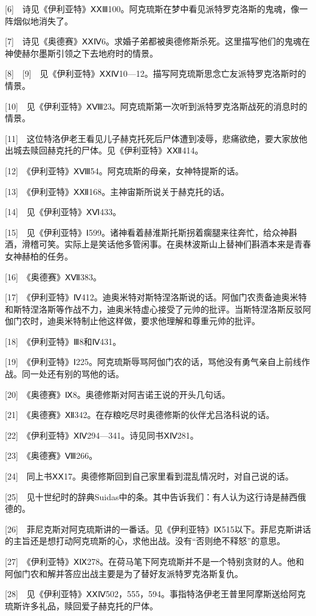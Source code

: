 \documentclass[12pt,oneside]{book}
\begin{document}
[6]　诗见《伊利亚特》ⅩⅩⅢ100。阿克琉斯在梦中看见派特罗克洛斯的鬼魂，像一阵烟似地消失了。

[7]　诗见《奥德赛》ⅩⅩⅣ6。求婚子弟都被奥德修斯杀死。这里描写他们的鬼魂在神使赫尔墨斯引领之下去地府时的情景。

[8]　[9]　见《伊利亚特》ⅩⅩⅣ10—12。描写阿克琉斯思念亡友派特罗克洛斯时的情景。

[10]　见《伊利亚特》ⅩⅧ23。阿克琉斯第一次听到派特罗克洛斯战死的消息时的情景。

[11]　这位特洛伊老王看见儿子赫克托死后尸体遭到凌辱，悲痛欲绝，要大家放他出城去赎回赫克托的尸体。见《伊利亚特》ⅩⅫ414。

[12]　《伊利亚特》ⅩⅧ54。阿克琉斯的母亲，女神特提斯的话。

[13]　《伊利亚特》ⅩⅫ168。主神宙斯所说关于赫克托的话。

[14]　见《伊利亚特》ⅩⅥ433。

[15]　见《伊利亚特》Ⅰ599。诸神看着赫淮斯托斯拐着瘸腿来往奔忙，给众神斟酒，滑稽可笑。实际上是笑话他多管闲事。在奥林波斯山上替神们斟酒本来是青春女神赫柏的任务。

[16]　《奥德赛》ⅩⅦ383。

[17]　《伊利亚特》Ⅳ412。迪奥米特对斯特涅洛斯说的话。阿伽门农责备迪奥米特和斯特涅洛斯等作战不力，迪奥米特虚心接受了元帅的批评。当斯特涅洛斯反驳阿伽门农时，迪奥米特制止他这样做，要求他理解和尊重元帅的批评。

[18]　《伊利亚特》Ⅲ8和Ⅳ431。

[19]　《伊利亚特》Ⅰ225。阿克琉斯辱骂阿伽门农的话，骂他没有勇气亲自上前线作战。同一处还有别的骂他的话。

[20]　《奥德赛》Ⅸ8。奥德修斯对阿吉诺王说的开头几句话。

[21]　《奥德赛》Ⅻ342。在存粮吃尽时奥德修斯的伙伴尤吕洛科说的话。

[22]　《伊利亚特》ⅩⅣ294—341。诗见同书ⅩⅣ281。

[23]　《奥德赛》Ⅷ266。

[24]　同上书ⅩⅩ17。奥德修斯回到自己家里看到混乱情况时，对自己说的话。

[25]　见十世纪时的辞典Suidas中的条。其中告诉我们：有人认为这行诗是赫西俄德的。

[26]　菲尼克斯对阿克琉斯讲的一番话。见《伊利亚特》Ⅸ515以下。菲尼克斯讲话的主旨还是想打动阿克琉斯的心，求他出战。没有“否则绝不释怒”的意思。

[27]　《伊利亚特》ⅩⅨ278。在荷马笔下阿克琉斯并不是一个特别贪财的人。他和阿伽门农和解并答应出战主要是为了替好友派特罗克洛斯复仇。

[28]　见《伊利亚特》ⅩⅩⅣ502，555，594。事指特洛伊老王普里阿摩斯送给阿克琉斯许多礼品，赎回爱子赫克托的尸体。
\end{document}
